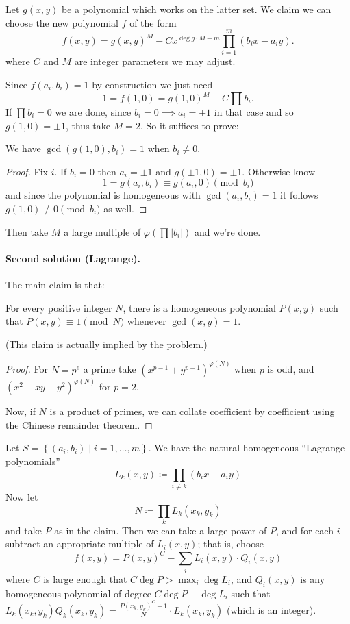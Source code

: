 \documentclass[11pt]{scrartcl}
\begin{document}
Let $g(x,y)$ be a polynomial which works on the latter set.
We claim we can choose the new polynomial $f$ of the form
\[ f(x,y) = g(x,y)^{M} - C x^{\deg g \cdot M-m} \prod_{i=1}^m (b_i x - a_i y). \]
where $C$ and $M$ are integer parameters we may adjust.

Since $f(a_i, b_i) = 1$ by construction we just need
\[ 1 = f(1,0) = g(1,0)^M - C \prod b_i. \]
If $\prod b_i = 0$ we are done,
since $b_i = 0 \implies a_i = \pm 1$ in that case
and so $g(1, 0) = \pm 1$, thus take $M = 2$.
So it suffices to prove:
\begin{claim*}
  We have $\gcd\left( g(1,0), b_i \right) = 1$ when $b_i \neq 0$.
\end{claim*}
\begin{proof}
  Fix $i$. If $b_i = 0$ then $a_i = \pm 1$ and $g(\pm 1,0) = \pm 1$.
  Otherwise know
  \[ 1 = g(a_i, b_i) \equiv g(a_i, 0) \pmod{b_i} \]
  and since the polynomial is homogeneous with $\gcd(a_i, b_i) = 1$
  it follows $g(1,0) \not\equiv 0 \pmod{b_i}$ as well.
\end{proof}
Then take $M$ a large multiple of $\varphi(\prod |b_i|)$ and we're done.

\paragraph{Second solution (Lagrange).}
The main claim is that:
\begin{claim*}
  For every positive integer $N$,
  there is a homogeneous polynomial $P(x,y)$ such that
  $P(x,y) \equiv 1 \pmod N$ whenever $\gcd(x,y) = 1$.
\end{claim*}
(This claim is actually implied by the problem.)
\begin{proof}
  For $N = p^e$ a prime take $(x^{p-1} + y^{p-1})^{\varphi(N)}$
  when $p$ is odd, and $(x^2+xy+y^2)^{\varphi(N)}$ for $p=2$.

  Now, if $N$ is a product of primes,
  we can collate coefficient by coefficient using the
  Chinese remainder theorem.
\end{proof}

Let $S = \left\{ (a_i, b_i) \mid i=1, \dots, m \right\}$.
We have the natural homogeneous ``Lagrange polynomials''
\[ L_k(x,y) \coloneqq \prod_{i \neq k} (b_i x - a_i y) \]
Now let
\[ N \coloneqq \prod_k L_k(x_k, y_k) \]
and take $P$ as in the claim.
Then we can take a large power of $P$,
and for each $i$ subtract an appropriate multiple of $L_i(x,y)$; that is, choose
\[
  f(x,y)
  = P(x,y)^{C} - \sum_i L_i(x,y) \cdot Q_i(x,y)
\]
where $C$ is large enough that $C \deg P > \max_i \deg L_i$,
and $Q_i(x,y)$ is any homogeneous polynomial of degree $C \deg P - \deg L_i$
such that $L_k(x_k, y_k) Q_k(x_k, y_k) = \frac{P(x_k, y_k)^C - 1}{N} \cdot L_k(x_k, y_k)$
(which is an integer).
\pagebreak
\end{document}
